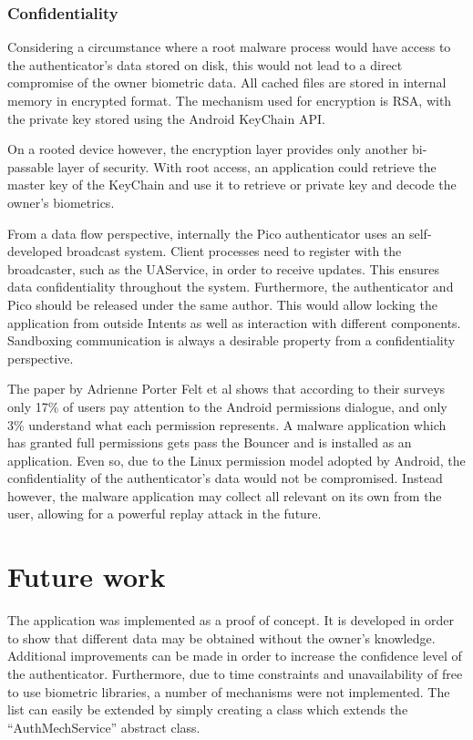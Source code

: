 \subsubsection*{Confidentiality}
Considering a circumstance where a root malware process would have access to the authenticator's data stored on disk, this would not lead to a direct compromise of the owner biometric data. All cached files are stored in internal memory in encrypted format. The mechanism used for encryption is RSA, with the private key stored using the Android KeyChain API.

On a rooted device however, the encryption layer provides only another bi-passable layer of security. With root access, an application could retrieve the master key of the KeyChain and use it to retrieve or private key and decode the owner's biometrics.

From a data flow perspective, internally the Pico authenticator uses an self-developed broadcast system. Client processes need to register with the broadcaster, such as the UAService, in order to receive updates. This ensures data confidentiality throughout the system. Furthermore, the authenticator and Pico should be released under the same author. This would allow locking the application from outside Intents as well as interaction with different components. Sandboxing communication is always a desirable property from a confidentiality perspective.

The paper by Adrienne Porter Felt et al \cite{felt2012android} shows that according to their surveys only 17\% of users pay attention to the Android permissions dialogue, and only 3\% understand what each permission represents. A malware application which has granted full permissions gets pass the Bouncer and is installed as an application. Even so, due to the Linux permission model adopted by Android, the confidentiality of the authenticator's data would not be compromised. Instead however, the malware application may collect all relevant on its own from the user, allowing for a powerful replay attack in the future.

\section{Future work}
The application was implemented as a proof of concept. It is developed in order to show that different data may be obtained without the owner's knowledge. Additional improvements can be made in order to increase the confidence level of the authenticator.  Furthermore, due to time constraints and unavailability of free to use biometric libraries, a number of mechanisms were not implemented. The list can easily be extended by simply creating a class which extends the ``AuthMechService'' abstract class.

